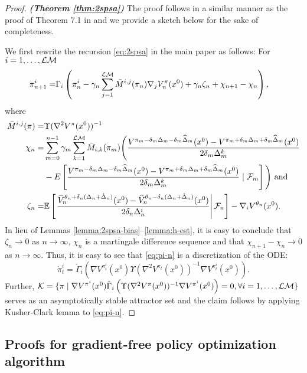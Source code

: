 \begin{proof}\textbf{\textit{(Theorem \ref{thm:2spsa})}}
The proof follows in a similar manner as the proof of Theorem 7.1 in \cite{Bhatnagar13SR} and we provide a sketch below for the sake of completeness.

We first rewrite the recursion \eqref{eq:2spsa} in the main paper as follows:
For $i=1,\ldots, \mathcal{L}\mathcal{M}$
\begin{align}
 \pi^{i}_{n+1} =& \Gamma_{i}\left(\pi^{i}_n - \gamma_n \sum_{j=1}^{\mathcal{L}\mathcal{M}} \bar M^{i,j}(\pi_n) \nabla_{j} V^\pi_n(x^0) + \gamma_n \zeta_n + \chi_{n+1} - \chi_n \right), \label{eq:pi-n}
\end{align}
where 
\begin{align*}
\bar M^{i,j}(\pi) = &\Upsilon(\nabla^2 V^{\pi}(x^0))^{-1}\\
 \chi_n =& \sum_{m=0}^{n-1} \gamma_m \sum_{k=1}^{\mathcal{L}\mathcal{M}} {\bar{M}}_{i,k}(\pi_m)\Bigg(
\frac{V^{\pi_m-\delta_m\Delta_m - \delta_m\widehat\Delta_m}(x^0) -
V^{\pi_m+\delta_m\Delta_m + \delta_m\widehat\Delta_m}(x^0)}{2\delta_m \Delta^k_m} 
 \\
 &- E\left[\frac{V^{\pi_m-\delta_m\Delta_m - \delta_m\widehat\Delta_m}(x^0) -
V^{\pi_m+\delta_m\Delta_m + \delta_m\widehat\Delta_m}(x^0)}{2\delta_m \Delta^k_m} 
\mid {\cal F}_m\right]\Bigg) \text{ and}\\
\zeta_n = &\mathbb{E}\left[\left.\dfrac{\widehat V_n^{\theta_n + \delta_n (\Delta_n + \hat \Delta_n)}(x^0) -\widehat V_n^{\theta_n - \delta_n (\Delta_n + \hat \Delta_n)}(x^0)}{2 \delta_n \Delta_n^i}\right| \mathcal{F}_n \right] - \nabla_i V^{\theta_n}(x^0).
\end{align*}
In lieu of Lemmas \ref{lemma:2spsa-bias}--\ref{lemma:h-est}, it is easy to conclude that $\zeta_n \rightarrow 0$ as $n\rightarrow \infty$, $\chi_n$ is a martingale difference sequence and that $\chi_{n+1} - \chi_n \rightarrow 0$ as $n\rightarrow \infty$. 
Thus, it is easy to see that \eqref{eq:pi-n} is a discretization of the ODE:
$$
\dot\pi^{i}_t = \check\Gamma_{i}\left( \nabla V^{\pi^{i}_t}(x^0) \Upsilon(\nabla^2 V^{\pi_t}(x^0))^{-1} \nabla V^{\pi^{i}_t}(x^0) \right).$$
Further, $\mathcal{K} = \{\pi \mid
\nabla V^{\pi^{i}}(x^0)  \check\Gamma_{i}\left(\Upsilon(\nabla^2 V^{\pi}(x^0))^{-1} \nabla V^{\pi^{i}}(x^0)\right)
=0, \forall i=1,\ldots,\mathcal{L}\mathcal{M}\}$ serves as an asymptotically stable attractor set and the claim follows by applying Kusher-Clark lemma to \eqref{eq:pi-n}.
\end{proof}

\subsection{Proofs for gradient-free policy optimization algorithm}
\label{appendix:mras}

